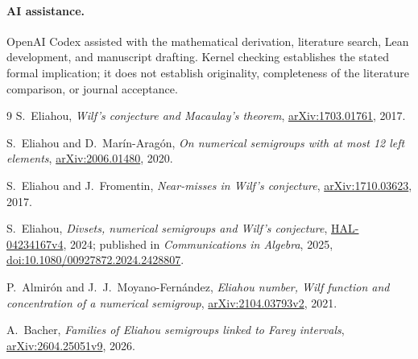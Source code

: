 \documentclass[11pt]{article}
\begin{document}
\paragraph{AI assistance.}
OpenAI Codex assisted with the mathematical derivation, literature search,
Lean development, and manuscript drafting. Kernel checking establishes the
stated formal implication; it does not establish originality, completeness
of the literature comparison, or journal acceptance.

\begin{thebibliography}{9}
S.~Eliahou, \emph{Wilf's conjecture and Macaulay's theorem},
\href{https://arxiv.org/abs/1703.01761}{arXiv:1703.01761}, 2017.

S.~Eliahou and D.~Mar\'in-Arag\'on,
\emph{On numerical semigroups with at most 12 left elements},
\href{https://arxiv.org/abs/2006.01480}{arXiv:2006.01480}, 2020.

S.~Eliahou and J.~Fromentin, \emph{Near-misses in Wilf's conjecture},
\href{https://arxiv.org/abs/1710.03623}{arXiv:1710.03623}, 2017.

S.~Eliahou, \emph{Divsets, numerical semigroups and Wilf's conjecture},
\href{https://hal.science/hal-04234167v4}{HAL-04234167v4}, 2024;
published in \emph{Communications in Algebra}, 2025,
\href{https://doi.org/10.1080/00927872.2024.2428807}{doi:10.1080/00927872.2024.2428807}.

P.~Almir\'on and J.~J.~Moyano-Fern\'andez,
\emph{Eliahou number, Wilf function and concentration of a numerical semigroup},
\href{https://arxiv.org/abs/2104.03793v2}{arXiv:2104.03793v2}, 2021.

A.~Bacher, \emph{Families of Eliahou semigroups linked to Farey intervals},
\href{https://arxiv.org/abs/2604.25051v9}{arXiv:2604.25051v9}, 2026.
\end{thebibliography}
\end{document}
